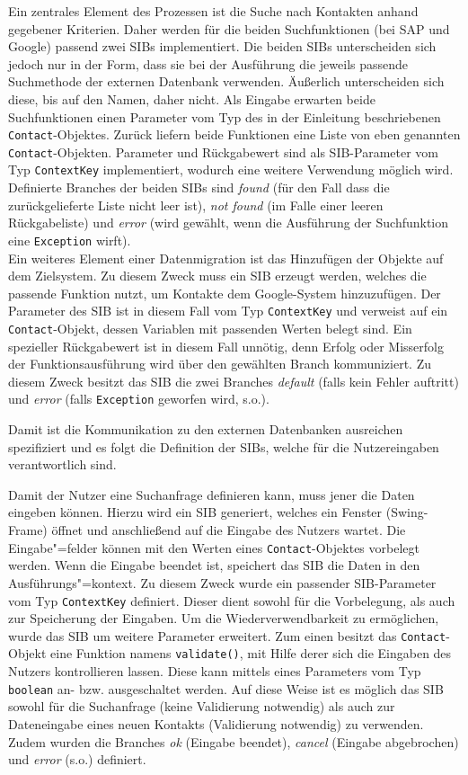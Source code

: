 Ein zentrales Element des Prozessen ist die Suche nach Kontakten anhand gegebener Kriterien.
Daher werden für die beiden Suchfunktionen (bei SAP und Google) passend zwei SIBs implementiert.
Die beiden SIBs unterscheiden sich jedoch nur in der Form, dass sie bei der Ausführung die jeweils passende Suchmethode
 der externen Datenbank verwenden.
Äußerlich unterscheiden sich diese, bis auf den Namen, daher nicht.
Als Eingabe erwarten beide Suchfunktionen einen Parameter vom Typ des in der Einleitung beschriebenen \lstinline{Contact}-Objektes.
Zurück liefern beide Funktionen eine Liste von eben genannten \lstinline{Contact}-Objekten. Parameter und Rückgabewert
 sind als SIB-Parameter vom Typ \lstinline{ContextKey} implementiert, wodurch eine weitere Verwendung möglich wird.
Definierte Branches der beiden SIBs sind \emph{found} (für den Fall dass die zurückgelieferte Liste nicht leer ist),
 \emph{not found} (im Falle einer leeren Rückgabeliste) und \emph{error} (wird gewählt, wenn die Ausführung der
 Suchfunktion eine \lstinline{Exception} wirft).\\

Ein weiteres Element einer Datenmigration ist das Hinzufügen der Objekte auf dem Zielsystem.
Zu diesem Zweck muss ein SIB erzeugt werden, welches die passende Funktion nutzt, um Kontakte dem Google-System hinzuzufügen.
Der Parameter des SIB ist in diesem Fall vom Typ \lstinline{ContextKey} und verweist auf ein \lstinline{Contact}-Objekt,
 dessen Variablen mit passenden Werten belegt sind.
Ein spezieller Rückgabewert ist in diesem Fall unnötig, denn Erfolg oder Misserfolg der Funktionsausführung wird über
 den gewählten Branch kommuniziert.
Zu diesem Zweck besitzt das SIB die zwei Branches \emph{default} (falls kein Fehler auftritt) und \emph{error} (falls
 \lstinline{Exception} geworfen wird, s.o.).

Damit ist die Kommunikation zu den externen Datenbanken ausreichen spezifiziert und es folgt die Definition der SIBs,
 welche für die Nutzereingaben verantwortlich sind.

Damit der Nutzer eine Suchanfrage definieren kann, muss jener die Daten eingeben können.
Hierzu wird ein SIB generiert, welches ein Fenster (Swing-Frame) öffnet und anschließend auf die Eingabe des Nutzers wartet.
Die Eingabe"=felder können mit den Werten eines \lstinline{Contact}-Objektes vorbelegt werden.
Wenn die Eingabe beendet ist, speichert das SIB die Daten in den Ausführungs"=kontext.
Zu diesem Zweck wurde ein passender SIB-Parameter vom Typ \lstinline{ContextKey} definiert.
Dieser dient sowohl für die Vorbelegung, als auch zur Speicherung der Eingaben.
Um die Wiederverwendbarkeit zu ermöglichen, wurde das SIB um weitere Parameter erweitert.
Zum einen besitzt das \lstinline{Contact}-Objekt eine Funktion namens \lstinline{validate()}, mit Hilfe derer sich die
 Eingaben des Nutzers kontrollieren lassen.
Diese kann mittels eines Parameters vom Typ \lstinline{boolean} an- bzw. ausgeschaltet werden.
Auf diese Weise ist es möglich das SIB sowohl für die Suchanfrage (keine Validierung notwendig) als auch zur Dateneingabe
 eines neuen Kontakts (Validierung notwendig) zu verwenden.
Zudem wurden die Branches \emph{ok} (Eingabe beendet), \emph{cancel} (Eingabe abgebrochen) und \emph{error} (s.o.) definiert.

